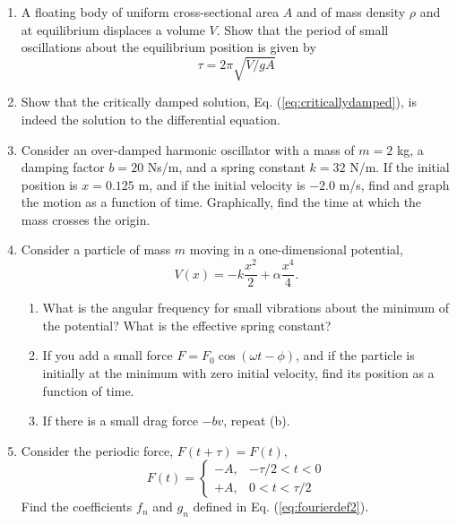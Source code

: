 \begin{enumerate}

\item A floating body of uniform cross-sectional area $A$ and of mass density $\rho$ and at equilibrium displaces a volume $V$. Show that the period of small oscillations about the equilibrium position is given by 
\[
\tau=2\pi\sqrt{V/gA}
\]

\item Show that the critically damped solution, Eq. (\ref{eq:criticallydamped}), is indeed the solution to the differential equation.

\item Consider an over-damped harmonic oscillator with a mass of $m=2$ kg, a damping factor $b=20$ Ns/m, and a spring constant $k=32$ N/m. If the initial position is $x=0.125$ m, and if the initial velocity is $-2.0$ m/s, find and graph the motion as a function of time. Graphically, find the time at which the mass crosses the origin.

\item Consider a particle of mass $m$ moving in a one-dimensional potential,
\[
V(x)=-k\frac{x^2}{2}+\alpha\frac{x^4}{4}.
\]
\begin{enumerate}
\item What is the angular frequency for small vibrations about the minimum of the potential? What is the effective spring constant?
\item If you add a small force $F=F_0\cos(\omega t-\phi)$, and if the particle is initially at the minimum with zero initial velocity, find its position as a function of time.
\item If there is a small drag force $-bv$, repeat (b).
\end{enumerate}

\item Consider the periodic force, $F(t+\tau)=F(t)$,
\[
F(t)=\left\{\begin{array}{rl}
-A,&-\tau/2<t<0\\
+A,&0<t<\tau/2
\end{array}\right.
\]
Find the coefficients $f_n$ and $g_n$ defined in Eq. (\ref{eq:fourierdef2}).


\end{enumerate}
